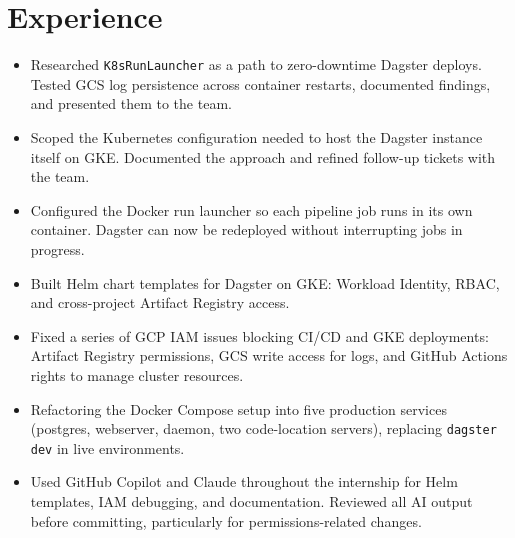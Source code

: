 %
\section*{Experience}

\begin{itemize}

  \item Researched \texttt{K8sRunLauncher} as a path to zero-downtime Dagster deploys.
        Tested GCS log persistence across container restarts, documented findings, and presented them to the team.

  \item Scoped the Kubernetes configuration needed to host the Dagster instance itself on GKE.
        Documented the approach and refined follow-up tickets with the team.

  \item Configured the Docker run launcher so each pipeline job runs in its own container.
        Dagster can now be redeployed without interrupting jobs in progress.

  \item Built Helm chart templates for Dagster on GKE: Workload Identity, RBAC, and
        cross-project Artifact Registry access.

  \item Fixed a series of GCP IAM issues blocking CI/CD and GKE deployments: Artifact Registry
        permissions, GCS write access for logs, and GitHub Actions rights to manage cluster resources.

  \item Refactoring the Docker Compose setup into five production services (postgres, webserver,
        daemon, two code-location servers), replacing \texttt{dagster dev} in live environments.

  \item Used GitHub Copilot and Claude throughout the internship for Helm templates, IAM debugging,
        and documentation. Reviewed all AI output before committing, particularly for permissions-related changes.

\end{itemize}


